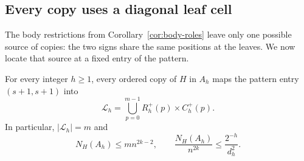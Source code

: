 \subsection{Every copy uses a diagonal leaf cell}
\label{subsec:copy-count}

The body restrictions from Corollary~\ref{cor:body-roles} leave only one
possible source of copies: the two signs share the same positions at the
leaves.  We now locate that source at a fixed entry of the pattern.

\begin{proposition}\label{prop:copy-count}
For every integer $h\geq 1$, every ordered copy of $H$ in $A_h$ maps the
pattern entry $(s+1,s+1)$ into
\[
 \mathcal L_h
 =\bigcup_{p=0}^{m-1} R_h^+(p)\times C_h^+(p).
\]
In particular, $|\mathcal L_h|=m$ and
\begin{equation}\label{eq:copy-bound}
 N_H(A_h)\leq m n^{2k-2},
 \qquad
 \frac{N_H(A_h)}{n^{2k}}
 \leq \frac{2^{-h}}{d_h^2}.
\end{equation}
\end{proposition}

